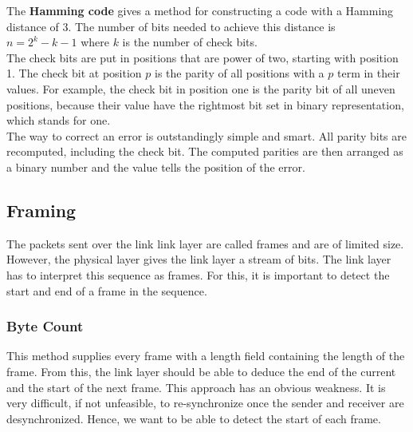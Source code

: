 The \textbf{Hamming code} gives a method for constructing a code with a Hamming distance of 3. The number of bits needed to achieve this distance is $n = 2^k - k - 1$ where $k$ is the number of check bits.\\
The check bits are put in positions that are power of two, starting with position 1. The check bit at position $p$ is the parity of all positions with a $p$ term in their values. For example, the check bit in position one is the parity bit of all uneven positions, because their value have the rightmost bit set in binary representation, which stands for one.\\
The way to correct an error is outstandingly simple and smart. All parity bits are recomputed, including the check bit. The computed parities are then arranged as a binary number and the value tells the position of the error.

\subsection{Framing}
The packets sent over the link link layer are called frames and are of limited size. However, the physical layer gives the link layer a stream of bits. The link layer has to interpret this sequence as frames. For this, it is important to detect the start and end of a frame in the sequence. 

\subsubsection{Byte Count}
This method supplies every frame with a length field containing the length of the frame. From this, the link layer should be able to deduce the end of the current and the start of the next frame. This approach has an obvious weakness. It is very difficult, if not unfeasible, to re-synchronize once the sender and receiver are desynchronized. Hence, we want to be able to detect the start of each frame.

